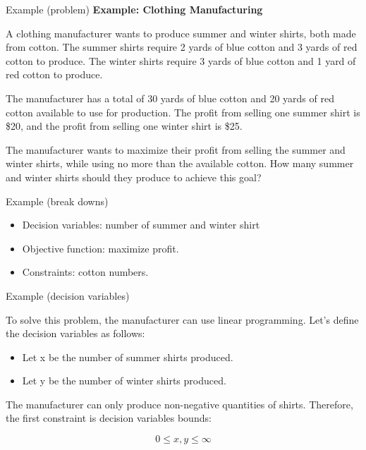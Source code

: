 \documentclass{beamer}
\begin{document}
\begin{frame}{Example (problem)}
    \textbf{Example: Clothing Manufacturing}

    A clothing manufacturer wants to produce summer and winter shirts, both made from cotton. The summer shirts require 2 yards of blue cotton and 3 yards of red cotton to produce. The winter shirts require 3 yards of blue cotton and 1 yard of red cotton to produce.

    The manufacturer has a total of 30 yards of blue cotton and 20 yards of red cotton available to use for production. The profit from selling one summer shirt is \$20, and the profit from selling one winter shirt is \$25.

    The manufacturer wants to maximize their profit from selling the summer and winter shirts, while using no more than the available cotton. How many summer and winter shirts should they produce to achieve this goal?
\end{frame}

\begin{frame}{Example (break downs)}

    \begin{itemize}
        \item Decision variables: number of summer and winter shirt
        \item Objective function: maximize profit.
        \item Constraints: cotton numbers.
    \end{itemize}

\end{frame}

\begin{frame}{Example (decision variables)}

    To solve this problem, the manufacturer can use linear programming. Let's define the decision variables as follows:
    \begin{itemize}
        \item Let x be the number of summer shirts produced.
        \item Let y be the number of winter shirts produced.
    \end{itemize}

    The manufacturer can only produce non-negative quantities of shirts. Therefore, the first constraint is decision variables bounds:

    \begin{equation}
        0 \leq x, y \leq \infty
    \end{equation}

\end{frame}
\end{document}
